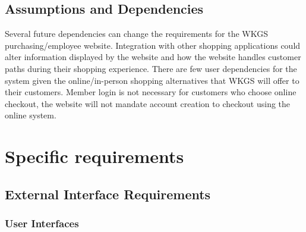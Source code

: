 \documentclass{scrreprt}
\theoremstyle{funreq}
\begin{document}
\section{Assumptions and Dependencies}
Several future dependencies can change the requirements for the WKGS purchasing/employee website. Integration with other shopping applications could alter information displayed by the website and how the website handles customer paths during their shopping experience. There are few user dependencies for the system given the online/in-person shopping alternatives that WKGS will offer to their customers. Member login is not necessary for customers who choose online checkout, the website will not mandate account creation to checkout using the online system. %


{\let\clearpage\relax 
\chapter{Specific requirements}}

\section{External Interface Requirements}

\subsection{User Interfaces}
\end{document}
